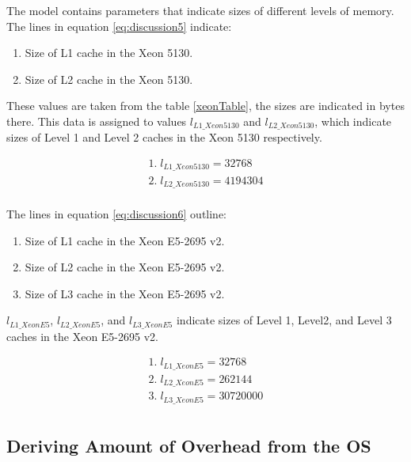 The model contains parameters that indicate sizes of different levels of memory. The lines in equation \ref{eq:discussion5} indicate:

\begin{enumerate}
  \item Size of L1 cache in the Xeon 5130.
  \item Size of L2 cache in the Xeon 5130.
\end{enumerate}

These values are taken from the table \ref{xeonTable}, the sizes are indicated in bytes there. This data is assigned to values $l_{L1\_Xeon5130}$ and $l_{L2\_Xeon5130}$, which indicate sizes of Level 1 and Level 2 caches in the Xeon 5130 respectively.

\begin{equation}\label{eq:discussion5}
\begin{split}
1.\; l_{L1\_Xeon5130} = 32768 \\
2.\; l_{L2\_Xeon5130} = 4194304 \\
\end{split}
\end{equation}

The lines in equation \ref{eq:discussion6} outline:

\begin{enumerate}
  \item Size of L1 cache in the Xeon E5-2695 v2.
  \item Size of L2 cache in the Xeon E5-2695 v2.
  \item Size of L3 cache in the Xeon E5-2695 v2.
\end{enumerate}

$l_{L1\_XeonE5}$, $l_{L2\_XeonE5}$, and $l_{L3\_XeonE5}$ indicate sizes of Level 1, Level2, and Level 3 caches in the Xeon E5-2695 v2.

\begin{equation}\label{eq:discussion6}
\begin{split}
1.\; l_{L1\_XeonE5} = 32768 \\
2.\; l_{L2\_XeonE5} = 262144 \\
3.\; l_{L3\_XeonE5} = 30720000 \\
\end{split}
\end{equation}

\subsection{Deriving Amount of Overhead from the OS}


